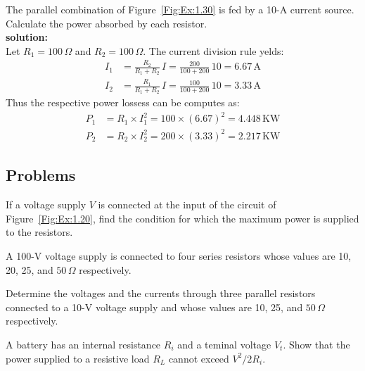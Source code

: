 \begin{exercise}
\label{ex:1.30}
The parallel combination of Figure~\ref{Fig:Ex:1.30} is fed by a 10-A current source. Calculate the power absorbed by each resistor.\\

\textbf{solution:}\\
Let $R_1=100\,\Omega$ and $R_2=100\,\Omega$. The current division rule yelds:
\begin{equation*}
\begin{split}
I_1 &= \frac{R_2}{R_1 + R_2}\,I= \frac{200}{100 + 200}\,10 = 6.67\,\textrm{A}\\
I_2 &= \frac{R_1}{R_1 + R_2}\,I= \frac{100}{100 + 200}\,10 = 3.33\,\textrm{A}
\end{split}
\end{equation*}
Thus the respective power lossess can be computes as:
\begin{equation*}
\begin{split}
P_1 &= R_1 \times I_1^2= 100 \times (6.67)^2 = 4.448\,\textrm{KW}\\
P_2 &= R_2 \times I_2^2= 200 \times (3.33)^2 = 2.217\,\textrm{KW}
\end{split}
\end{equation*}
\end{exercise}

\subsection*{Problems}
\begin{problem}
If a voltage supply $V$ is connected at the input of the circuit of Figure~\ref{Fig:Ex:1.20}, find the condition for which the maximum power is supplied to the resistors.
\end{problem}

\begin{problem}
A 100-V voltage supply is connected to four series resistors whose values are 10, 20, 25, and $50\,\Omega$ respectively.
\end{problem}

\begin{problem}
Determine the voltages and the currents through three parallel resistors connected to a 10-V voltage supply and whose values are 10, 25, and $50\,\Omega$ respectively.
\end{problem}

\begin{problem}
A battery has an internal resistance $R_i$ and a teminal voltage $V_t$. Show that the power supplied to a resistive load $R_L$ cannot exceed $V^2/2R_i$.
\end{problem}


